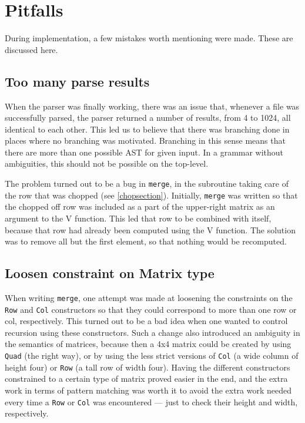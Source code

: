 \documentclass[a4paper,12pt,notitlepage]{report}
\begin{document}
\section{Pitfalls}
During implementation, a few mistakes worth mentioning were made. These
are discussed here. 

\subsection{Too many parse results}
When the parser was finally working, there was an issue that, whenever a file
was successfully parsed, the parser returned a number of results, from 4 to
1024, all identical to each other. This led us to believe that there was
branching done in places where no branching was motivated. Branching in this
sense means that there are more than one possible AST for given input. In a
grammar without ambiguities, this should not be possible on the top-level.

The problem turned out to be a bug in \texttt{merge}, in the subroutine taking
care of the row that was chopped (see \ref{chopsection}). Initially,
\texttt{merge} was written so that the chopped off row was included as a part of
the upper-right matrix as an argument to the V function. This led that row to be
combined with itself, because that row had already been computed using the V
function. The solution was to remove all but the first element, so that nothing
would be recomputed.

\subsection{Loosen constraint on Matrix type}
When writing \texttt{merge}, one attempt was made at loosening the constraints
on the \texttt{Row} and \texttt{Col} constructors so that they could correspond
to more than one row or col, respectively. This turned out to be a bad idea when
one wanted to control recursion using these constructors. Such a change also
introduced an ambiguity in the semantics of matrices, because then a 4x4 matrix
could be created by using \texttt{Quad} (the right way), or by using the less
strict versions of \texttt{Col} (a wide column of height four) or \texttt{Row}
(a tall row of width four). Having the different constructors constrained to a
certain type of matrix proved easier in the end, and the extra work in terms of
pattern matching was worth it to avoid the extra work needed every time a
\texttt{Row} or \texttt{Col} was encountered --- just to check their height and
width, respectively.  
\end{document}
